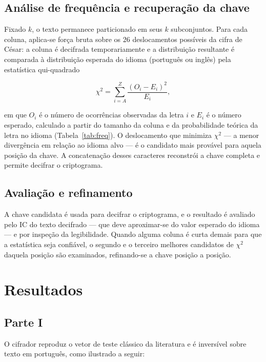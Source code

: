 \documentclass[conference]{IEEEtran}
\begin{document}
\subsection{Análise de frequência e recuperação da chave}
Fixado $k$, o texto permanece particionado em seus $k$ subconjuntos. Para cada
coluna, aplica-se força bruta sobre os $26$ deslocamentos possíveis da cifra de
César: a coluna é decifrada temporariamente e a distribuição resultante é
comparada à distribuição esperada do idioma (português ou inglês) pela
estatística qui-quadrado

\begin{equation}
\chi^2 = \sum_{i=A}^{Z} \frac{(O_i - E_i)^2}{E_i},
\label{eq:chi2}
\end{equation}

em que $O_i$ é o número de ocorrências observadas da letra $i$ e $E_i$ é o
número esperado, calculado a partir do tamanho da coluna e da probabilidade
teórica da letra no idioma (Tabela~\ref{tab:freq}). O deslocamento que
minimiza $\chi^2$ --- a menor divergência em relação ao idioma alvo --- é o
candidato mais provável para aquela posição da chave. A concatenação desses
caracteres reconstrói a chave completa e permite decifrar o criptograma.

\subsection{Avaliação e refinamento}
A chave candidata é usada para decifrar o criptograma, e o resultado é
avaliado pelo IC do texto decifrado --- que deve aproximar-se do valor
esperado do idioma --- e por inspeção da legibilidade. Quando alguma coluna é
curta demais para que a estatística seja confiável, o segundo e o terceiro
melhores candidatos de $\chi^2$ daquela posição são examinados, refinando-se a
chave posição a posição.

\section{Resultados}
\label{sec:resultados}
\subsection{Parte I}
O cifrador reproduz o vetor de teste clássico da literatura e é inversível
sobre texto em português, como ilustrado a seguir:
\end{document}
